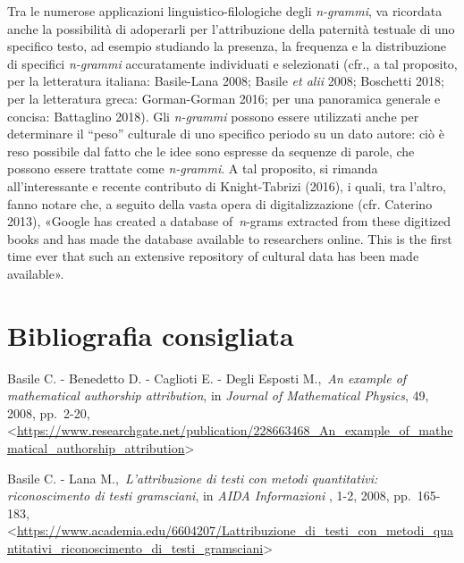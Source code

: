 \documentclass[
  b5paper,
  twoside,
  11pt,
  chapterprefix=false,
  bibliography=totocnumbered,
  listof=flat]{scrbook}
\begin{document}
Tra le numerose applicazioni linguistico-filologiche degli \emph{n-grammi},
va ricordata anche la possibilità di adoperarli per l'attribuzione della
paternità testuale di uno specifico testo, ad esempio studiando la
presenza, la frequenza e la distribuzione di specifici \emph{n-grammi}
accuratamente individuati e selezionati (cfr., a tal proposito, per la
letteratura italiana: Basile-Lana 2008; Basile \emph{et alii} 2008; Boschetti
2018; per la letteratura greca: Gorman-Gorman 2016; per una panoramica
generale e concisa: Battaglino 2018). Gli \emph{n-grammi} possono essere
utilizzati anche per determinare il \enquote{peso} culturale di uno specifico
periodo su un dato autore: ciò è reso possibile dal fatto che le idee
sono espresse da sequenze di parole, che possono essere trattate come
\emph{n-grammi}. A tal proposito, si rimanda all'interessante e recente
contributo di Knight-Tabrizi (2016), i quali, tra l'altro, fanno notare
che, a seguito della vasta opera di digitalizzazione (cfr. Caterino
2013), «Google has created a database of~\emph{n}-grams extracted from these
digitized books and has made the database available to researchers
online. This is the first time ever that such an extensive repository of
cultural data has been made available».

\hypertarget{bibliografia-consigliata-16}{%
\section*{Bibliografia consigliata}\label{bibliografia-consigliata-16}}

Basile C. - Benedetto D. - Caglioti E. - Degli Esposti M.,~\emph{An example
of mathematical authorship attribution}, in \emph{Journal of Mathematical
Physics}, 49, 2008, pp.~2-20,
\textless{}\href{https://www.researchgate.net/publication/228663468_An_example_of_mathematical_authorship_attribution}{{https://www.researchgate.net/publication/228663468\_An\_example\_of\_mathematical\_authorship\_attribution}}\textgreater{}

Basile C. - Lana M.,~\emph{L'attribuzione di testi con metodi quantitativi:
riconoscimento di testi gramsciani}, in \emph{AIDA Informazioni} , 1-2, 2008,
pp.~165-183,
\textless{}\href{https://www.academia.edu/6604207/Lattribuzione_di_testi_con_metodi_quantitativi_riconoscimento_di_testi_gramsciani}{{https://www.academia.edu/6604207/Lattribuzione\_di\_testi\_con\_metodi\_quantitativi\_riconoscimento\_di\_testi\_gramsciani}}\textgreater{}
\end{document}
